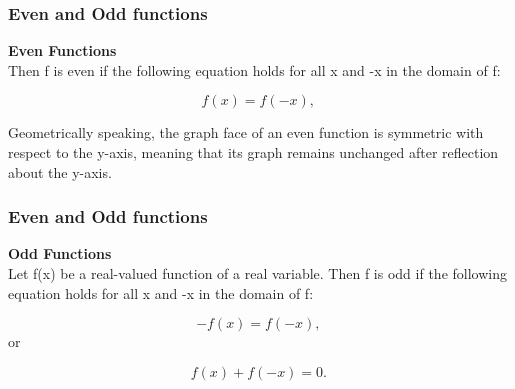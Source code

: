 
\begin{frame}
\frametitle{Even and Odd functions}
\Large
\textbf{Even Functions}\\
Then f is even if the following equation holds for all x and -x in the domain of f:

\[f(x) = f(-x), \,\]

Geometrically speaking, the graph face of an even function is symmetric with respect to the y-axis, meaning that its graph remains unchanged after reflection about the y-axis.
\end{frame}
\begin{frame}
\frametitle{Even and Odd functions}
\Large
\textbf{Odd Functions}\\
Let f(x) be a real-valued function of a real variable. Then f is odd if the following equation holds for all x and -x in the domain of f:

\[-f(x) = f(-x), \,\]
or

\[f(x) + f(-x) = 0. \,\]
\end{frame}

